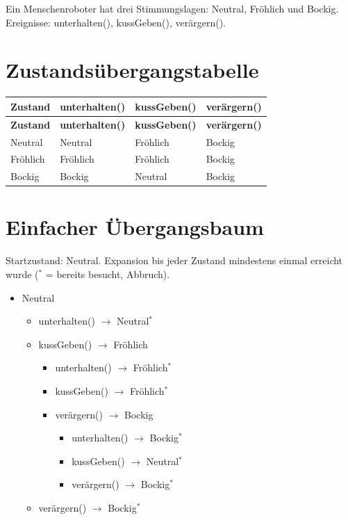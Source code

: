 \documentclass[
	fontsize=12pt,          %
	paper=a4,               %
	numbers=noenddot,       %
	listof=totoc,           %
	listof=entryprefix,     %
	listof=nochaptergap,    %
	bibliography=totoc,     %
	parskip=half,           %
	openany                 %
]{scrbook}
\begin{document}
Ein Menschenroboter hat drei Stimmungslagen: Neutral, Fröhlich und Bockig.
Ereignisse: unterhalten(), kussGeben(), verärgern().

\section*{Zustandsübergangstabelle}

\begin{longtable}{| p{2.5cm} | p{3.0cm} | p{3.0cm} | p{3.0cm} |}
	\hline
	\textbf{Zustand} & \textbf{unterhalten()} & \textbf{kussGeben()} & \textbf{verärgern()} \\ \hline
	\endfirsthead
	\hline
	\textbf{Zustand} & \textbf{unterhalten()} & \textbf{kussGeben()} & \textbf{verärgern()} \\ \hline
	\endhead
	\hline
	\endfoot
	Neutral & Neutral & Fröhlich & Bockig \\ \hline
	Fröhlich & Fröhlich & Fröhlich & Bockig \\ \hline
	Bockig & Bockig & Neutral & Bockig \\ \hline
\end{longtable}

\section*{Einfacher Übergangsbaum}

Startzustand: Neutral.
Expansion bis jeder Zustand mindestens einmal erreicht wurde ($^*$ = bereits besucht, Abbruch).

\begin{itemize}
	\item Neutral
	\begin{itemize}
		\item unterhalten() $\rightarrow$ Neutral$^*$
		\item kussGeben() $\rightarrow$ Fröhlich
		\begin{itemize}
			\item unterhalten() $\rightarrow$ Fröhlich$^*$
			\item kussGeben() $\rightarrow$ Fröhlich$^*$
			\item verärgern() $\rightarrow$ Bockig
			\begin{itemize}
				\item unterhalten() $\rightarrow$ Bockig$^*$
				\item kussGeben() $\rightarrow$ Neutral$^*$
				\item verärgern() $\rightarrow$ Bockig$^*$
			\end{itemize}
		\end{itemize}
		\item verärgern() $\rightarrow$ Bockig$^*$
	\end{itemize}
\end{itemize}
\end{document}
